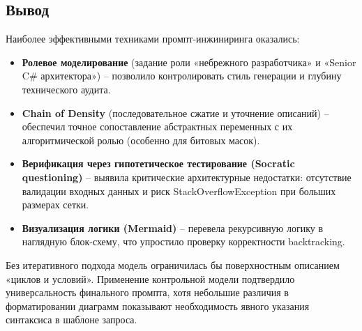 \subsection{Вывод}
\noindent
Наиболее эффективными техниками промпт-инжиниринга оказались:
\begin{itemize}
\item \textbf{Ролевое моделирование} (задание роли «небрежного разработчика» и «Senior C\# архитектора») – позволило контролировать стиль генерации и глубину технического аудита.
\item \textbf{Chain of Density} (последовательное сжатие и уточнение описаний) – обеспечил точное сопоставление абстрактных переменных с их алгоритмической ролью (особенно для битовых масок).
\item \textbf{Верификация через гипотетическое тестирование (Socratic questioning)} – выявила критические архитектурные недостатки: отсутствие валидации входных данных и риск StackOverflowException при больших размерах сетки.
\item \textbf{Визуализация логики (Mermaid)} – перевела рекурсивную логику в наглядную блок-схему, что упростило проверку корректности backtracking.
\end{itemize}
\raggedright
Без итеративного подхода модель ограничилась бы поверхностным описанием «циклов и условий». Применение контрольной модели подтвердило универсальность финального промпта, хотя небольшие различия в форматировании диаграмм показывают необходимость явного указания синтаксиса в шаблоне запроса.